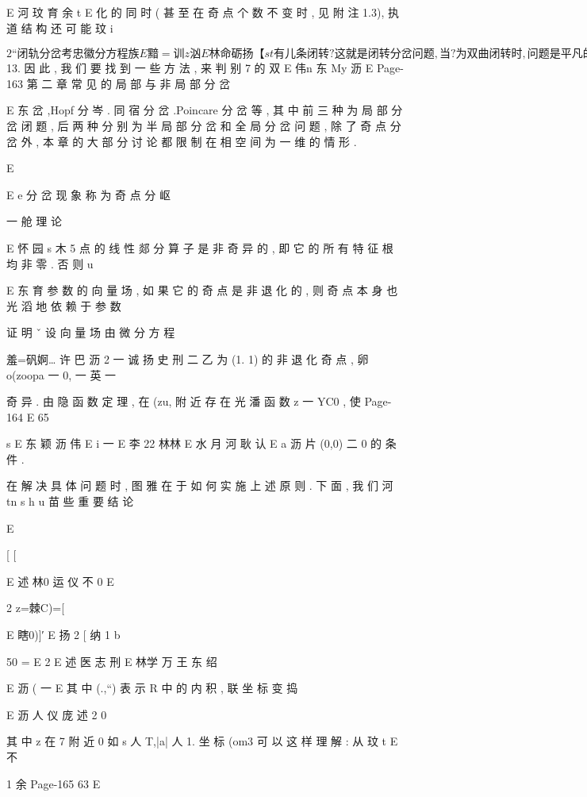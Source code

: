 {{{{{{{{{{{{{{{{{E 河 玟 育 余 t
E
化 的 同 时 ( 甚 至 在 奇 点 个 数 不 变 时 , 见 附 注 1.3), 执 道 结 构 还 可 能
玟
i

$ 2 “ 闭 轨 分 岔

考 忠 徽 分 方 程 族
E 黯=训z汹%

E 林 命 砺 扬
【 s t
有 儿 条 闭 转 ? 这 就 是 闭 转 分 岔 问 题 , 当 ? 为 双 曲 闭 转 时 , 问 题 是 平
凡 的 ( 见 第 一 章 $ 13. 因 此 , 我 们 要 找 到 一 些 方 法 , 来 判 别 7 的 双
E 伟n 东
My 沥
E
Page-163
第 二 章 常 见 的 局 部 与 非 局 部 分 岔

E 东
岔 ,Hopf 分 岑 . 同 宿 分 岔 .Poincare 分 岔 等 , 其 中 前 三 种 为 局 部 分 岔
闭 题 , 后 两 种 分 别 为 半 局 部 分 岔 和 全 局 分 岔 问 题 , 除 了 奇 点 分 岔
外 , 本 章 的 大 部 分 讨 论 都 限 制 在 相 空 间 为 一 维 的 情 形 .

E

E
e
分 岔 现 象 称 为 奇 点 分 岖

一 舱 理 论

E 怀 园 s 木 5
点 的 线 性 郯 分 算 子 是 非 奇 异 的 , 即 它 的 所 有 特 征 根 均 非 零 . 否 则
u

E 东 育 参 数 的 向 量 场 , 如 果 它 的 奇
点 是 非 退 化 的 , 则 奇 点 本 身 也 光 滔 地 依 赖 于 参 数

证 明 ˇ 设 向 量 场 由 微 分 方 程

羞=矾婀… 许
巴 沥 2 一 诚 扬 史 刑
二 乙 为 (1. 1) 的 非 退 化 奇 点 , 卵 o(zoopa 一 0, 一 英 一

奇 异 . 由 隐 函 数 定 理 , 在 (zu, 附 近 存 在 光 潘 函 数 z 一 YC0 , 使
Page-164
E 65

s
E 东 颖 沥
伟
E i 一
E 李 22 林林 E 水 月 河 耿 认
E a 沥
片 (0,0) 二 0 的 条 件 .

在 解 决 具 体 问 题 时 , 图 雅 在 于 如 何 实 施 上 述 原 则 . 下 面 , 我 们
河 tn s h u
苗 些 重 要 结 论

E

[ [

E 述 林0 运 仪 不 0
E

2 z=棘C)=[

E
瞎0)]′
E 扬 2
[ 纳
1 b

50 = E 2
E 述 医 志 刑 E 林学 万 王 东 绍

E 沥 ( 一 E
其 中 (.,“) 表 示 R 中 的 内 积 , 联 坐 标 变 捣

E 沥 人 仪 庞 述 2 0

其 中 z 在 7 附 近 0 如 s 人 T,|a| 人 1. 坐 标 (om3 可 以 这 样 理 解 : 从
玟
t
E 不

1 余
Page-165
63 E

}}}}}}}}}}}}}}}}}
